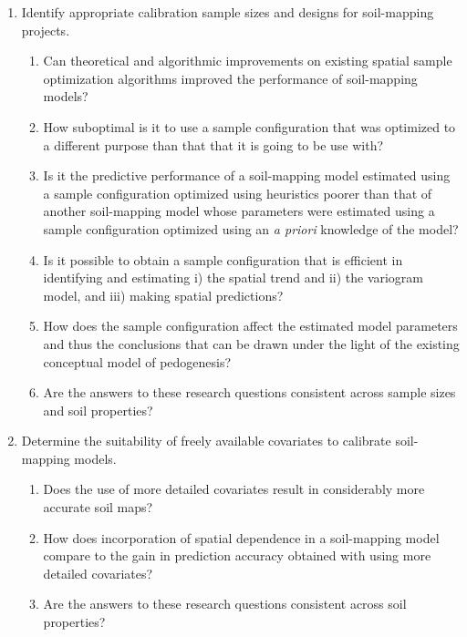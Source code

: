 \begin{enumerate}
\item Identify appropriate calibration sample sizes and designs for soil-mapping projects.

	\begin{enumerate}[label=(\alph*)]
	\item Can theoretical and algorithmic improvements on existing spatial sample optimization 
	algorithms improved the performance of soil-mapping models?
	
	\item How suboptimal is it to use a sample configuration that was optimized to a different 
	purpose than that that it is going to be use with?

	\item Is it the predictive performance of a soil-mapping model estimated using a sample 
	configuration optimized using heuristics poorer than that of another soil-mapping model 
	whose parameters were estimated using a sample configuration optimized using an 
	\textit{a priori} knowledge of the model?
	
	\item Is it possible to obtain a sample configuration that is efficient in identifying and
	estimating i) the spatial trend and ii) the variogram model, and iii) making spatial 
	predictions?
	
	\item How does the sample configuration affect the estimated model parameters and thus the
	conclusions that can be drawn under the light of the existing conceptual model of 
	pedogenesis?
	
	\item Are the answers to these research questions consistent across sample sizes and soil 
	properties?
	\end{enumerate}

\item Determine the suitability of freely available covariates to calibrate soil-mapping models.

	\begin{enumerate}[label=(\alph*)]
	\item Does the use of more detailed covariates result in considerably more accurate soil 
	maps?

	\item How does incorporation of spatial dependence in a soil-mapping model compare to the 
	gain in prediction accuracy obtained with using more detailed covariates?

	\item Are the answers to these research questions consistent across soil properties?
	\end{enumerate}
\end{enumerate}


